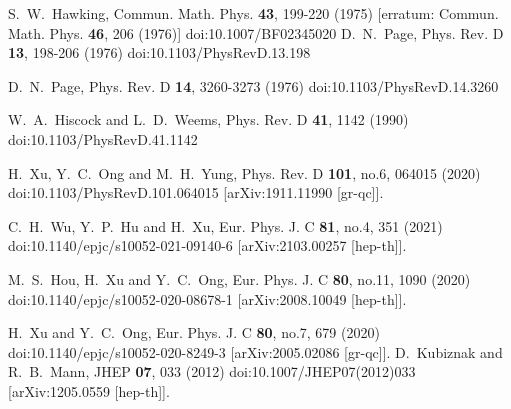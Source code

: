 \documentclass[a4paper,11pt]{article}
\begin{document}
\begin{thebibliography}{100}
S.~W.~Hawking,
Commun. Math. Phys. \textbf{43}, 199-220 (1975)
[erratum: Commun. Math. Phys. \textbf{46}, 206 (1976)]
doi:10.1007/BF02345020
D.~N.~Page,
Phys. Rev. D \textbf{13}, 198-206 (1976)
doi:10.1103/PhysRevD.13.198

D.~N.~Page,
Phys. Rev. D \textbf{14}, 3260-3273 (1976)
doi:10.1103/PhysRevD.14.3260

W.~A.~Hiscock and L.~D.~Weems,
Phys. Rev. D \textbf{41}, 1142 (1990)
doi:10.1103/PhysRevD.41.1142

H.~Xu, Y.~C.~Ong and M.~H.~Yung,
Phys. Rev. D \textbf{101}, no.6, 064015 (2020)
doi:10.1103/PhysRevD.101.064015
[arXiv:1911.11990 [gr-qc]].

C.~H.~Wu, Y.~P.~Hu and H.~Xu,
Eur. Phys. J. C \textbf{81}, no.4, 351 (2021)
doi:10.1140/epjc/s10052-021-09140-6
[arXiv:2103.00257 [hep-th]].

M.~S.~Hou, H.~Xu and Y.~C.~Ong,
Eur. Phys. J. C \textbf{80}, no.11, 1090 (2020)
doi:10.1140/epjc/s10052-020-08678-1
[arXiv:2008.10049 [hep-th]].

H.~Xu and Y.~C.~Ong,
Eur. Phys. J. C \textbf{80}, no.7, 679 (2020)
doi:10.1140/epjc/s10052-020-8249-3
[arXiv:2005.02086 [gr-qc]].
D.~Kubiznak and R.~B.~Mann,
JHEP \textbf{07}, 033 (2012)
doi:10.1007/JHEP07(2012)033
[arXiv:1205.0559 [hep-th]].


\end{thebibliography}
\end{document}
